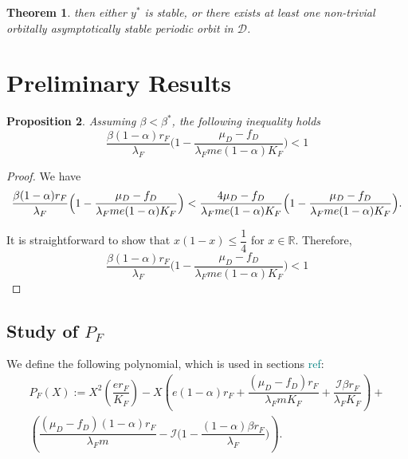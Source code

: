 \documentclass{article}
\newcommand{\lfw}{\lambda_{F}}
\newcommand{\lfw}{\lambda_{F}}
\newcommand{\cI}{\mathcal{I}}
\newcommand{\marc}[1]{\textcolor{teal}{#1}}
\newtheorem{theorem}{Theorem}
\newtheorem{prop}[theorem]{Proposition}
\theoremstyle{definition}
\theoremstyle{remark}
\begin{document}
\begin{appendix}
\begin{theorem}
then either $y^*$ is stable, or there exists at least one non-trivial orbitally asymptotically stable  periodic orbit in $\mathcal{D}$.
\end{theorem}

\section{Preliminary Results}
\begin{prop} \label{propBeta}
Assuming $\beta < \beta^*$, the following inequality holds
$$
\dfrac{\beta (1-\alpha) r_F}{\lfw} \Big(1 - \dfrac{\mu_D - f_D}{\lfw m e (1-\alpha) K_F}\Big) < 1
$$
\end{prop}

\begin{proof}
We have
\begin{equation*}
\dfrac{\beta (1-\alpha) r_F}{\lfw} \Big(1 - \dfrac{\mu_D - f_D}{\lfw m e (1-\alpha) K_F}\Big) < \dfrac{4 \mu_D - f_D}{\lfw m e (1-\alpha) K_F} \Big(1 - \dfrac{\mu_D - f_D}{\lfw m e (1-\alpha) K_F}\Big).\\
\end{equation*}

It is straightforward to show that $x(1 - x) \leq \dfrac{1}{4}$ for $x \in \mathbb{R}$. Therefore,
\begin{equation*}
\dfrac{\beta (1-\alpha) r_F}{\lfw} \Big(1 - \dfrac{\mu_D - f_D}{\lfw m e (1-\alpha) K_F}\Big) <  1
\end{equation*}
\end{proof}
\subsection{Study of $P_F$} \label{section:study of PF}
We define the following polynomial, which is used in sections \marc{ref}:
\begin{multline}
P_F(X) := X^2 \left(\dfrac{er_F}{K_F} \right) - X \left(e(1-\alpha)r_F + \dfrac{(\mu_D - f_D) r_F}{\lfw m K_F} + \dfrac{\cI \beta r_F}{\lfw K_F} \right) + \\ \left(\dfrac{(\mu_D - f_D)(1-\alpha) r_F}{\lfw m} - \cI\Big(1 - \dfrac{(1-\alpha)\beta r_F}{\lfw} \Big) \right).
\label{polynome-Feq}
\end{multline} 


\end{appendix}
\end{document}
